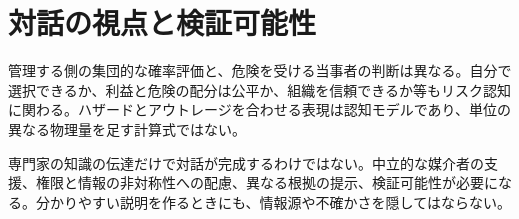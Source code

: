 \section{対話の視点と検証可能性}
\label{theory:safety:riskdialogue}
管理する側の集団的な確率評価と、危険を受ける当事者の判断は異なる。自分で選択できるか、利益と危険の配分は公平か、組織を信頼できるか等もリスク認知に関わる。ハザードとアウトレージを合わせる表現は認知モデルであり、単位の異なる物理量を足す計算式ではない\parencite{eth54_riskcomm}。

専門家の知識の伝達だけで対話が完成するわけではない。中立的な媒介者の支援、権限と情報の非対称性への配慮、異なる根拠の提示、検証可能性が必要になる。分かりやすい説明を作るときにも、情報源や不確かさを隠してはならない。

